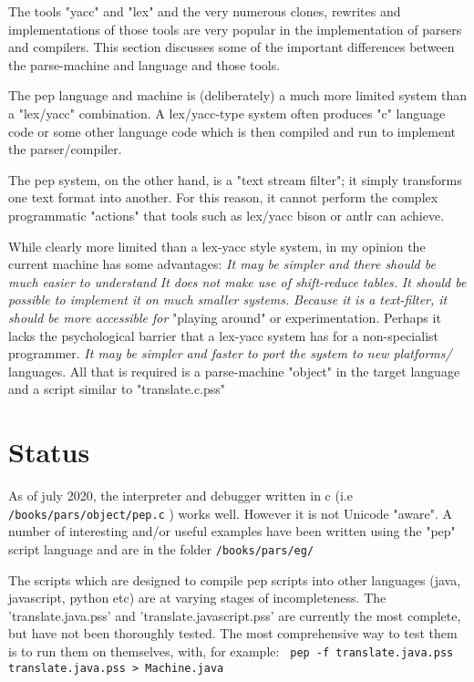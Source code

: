 \documentclass[a4paper,12pt]{article}
\begin{document}
  The tools "yacc" and "lex" and the very numerous clones, rewrites
  and implementations of those tools are very popular in the implementation
  of parsers and compilers. This section discusses some of the
  important differences between the parse-machine and language and
  those tools.

  The pep language and machine is (deliberately) a much more limited system
  than a "lex/yacc" combination. A lex/yacc-type system often produces "c"
  language code or some other language code which is then compiled and run to
  implement the parser/compiler.

  The pep system, on the other hand, is a "text stream filter"; it simply
  transforms one text format into another. For this reason, it cannot
  perform the complex programmatic "actions" that tools such as lex/yacc
  bison or antlr can achieve.

  While clearly more limited than a lex-yacc style system, in my opinion
  the current machine has some advantages:
 \emph{ It may be simpler and there should be much easier to understand }
 \emph{ It does not make use of shift-reduce tables. }
 \emph{ It should be possible to implement it on much smaller systems. }
 \emph{ Because it is a text-filter, it should be more accessible for }
      "playing around" or experimentation. Perhaps it lacks the
      psychological barrier that a lex-yacc system has for a
      non-specialist programmer.
 \emph{ It may be simpler and faster to port the system to new platforms/ }
      languages. All that is required is a parse-machine "object" in the
      target language and a script similar to "translate.c.pss"

\section{Status}

  As of july 2020, the interpreter and debugger written in c (i.e \texttt{/books/pars/object/pep.c} )
  works well. However it is not Unicode "aware". A number of interesting
  and/or useful examples have been written using the "pep" script language
  and are in the folder \texttt{/books/pars/eg/}

  The scripts which are designed to compile pep scripts into other languages
  (java, javascript, python etc) are at varying stages of incompleteness.
  The 'translate.java.pss' and 'translate.javascript.pss' are currently the most
  complete, but have not been thoroughly tested. The most comprehensive way to
  test them is to run them on themselves, with, for example: 
 \verb| pep -f translate.java.pss translate.java.pss > Machine.java |
\end{document}
